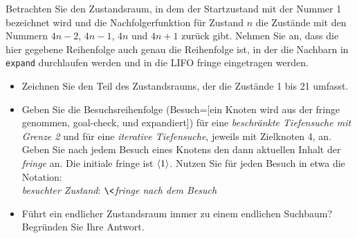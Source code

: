 


Betrachten Sie den Zustandsraum, in dem der Startzustand mit der
Nummer 1 bezeichnet wird und die Nachfolgerfunktion für Zustand $n$
die Zustände mit den Nummern $4n-2$, $4n-1$, $4n$ und $4n+1$ 
zurück gibt. Nehmen Sie an, dass die hier gegebene Reihenfolge auch
genau die Reihenfolge ist, in der die Nachbarn in \texttt{expand}
durchlaufen werden und in die LIFO fringe eingetragen werden.

\begin{itemize}
\item
Zeichnen Sie den Teil des Zustandsraums, der die Zustände 1 bis 21 umfasst.

\item
Geben Sie die Besuchsreihenfolge (Besuch=[ein Knoten wird aus der
fringe genommen, goal-check, und expandiert]) für eine {\em beschränkte
Tiefensuche mit Grenze 2} und für eine {\em iterative Tiefensuche},
jeweils mit Zielknoten 4, an. Geben Sie nach jedem Besuch eines
Knotens den dann aktuellen Inhalt der \emph{fringe} an. Die initiale
fringe ist $\left\langle 1 \right\rangle$. Nutzen Sie für jeden Besuch in etwa die Notation:\\
\emph{besuchter Zustand}: $\<$\emph{fringe nach dem Besuch}$\>$

\item
Führt ein endlicher Zustandsraum immer zu einem endlichen Suchbaum? Begründen Sie Ihre Antwort.
\end{itemize}


\exerfoot
